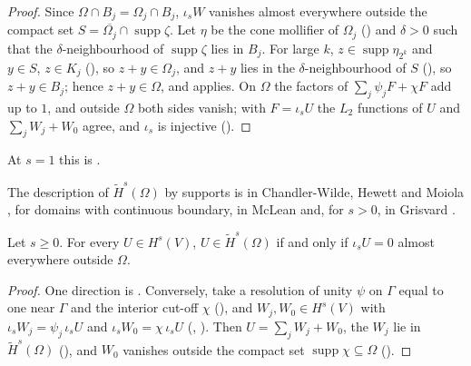 \begin{proof}
\leanok
Since $\Omega \cap B_j = \Omega_j \cap B_j$, $\iota_s W$ vanishes almost everywhere outside the
compact set $S = \overline{\Omega_j} \cap \operatorname{supp} \zeta$. Let $\eta$ be the cone
mollifier of $\Omega_j$ () and $\delta > 0$ such that the
$\delta$-neighbourhood of $\operatorname{supp} \zeta$ lies in $B_j$. For large $k$,
$z \in \operatorname{supp} \eta_{2^k}$ and $y \in S$, $z \in K_j$
(), so $z + y \in \Omega_j$, and $z + y$ lies in the
$\delta$-neighbourhood of $S$ (), so $z + y \in B_j$; hence $z + y \in \Omega$,
and  applies. On $\Omega$ the factors of
$\sum_j \psi_j F + \chi F$ add up to $1$, and outside $\Omega$ both sides vanish; with
$F = \iota_s U$ the $L_2$ functions of $U$ and $\sum_j W_j + W_0$ agree, and $\iota_s$ is
injective ().
\end{proof}

At $s = 1$ this is .

The description of $\tilde H^s(\Omega)$ by supports is in Chandler-Wilde, Hewett and Moiola
\cite[Lemma 3.15]{ChandlerWildeHewettMoiola}, for domains with continuous boundary, in McLean
\cite[Theorem 3.29]{McLean} and, for $s > 0$, in Grisvard \cite[Theorem 1.4.2.2]{Grisvard}.

\begin{theorem}
\label{thm:tilde-space-supports-general}
\leanok
{}
Let $s \geq 0$. For every $U \in H^s(V)$, $U \in \tilde H^s(\Omega)$ if and only if
$\iota_s U = 0$ almost everywhere outside $\Omega$.
\end{theorem}

\begin{proof}
\leanok
One direction is . Conversely, take a resolution
of unity $\psi$ on $\Gamma$ equal to one near $\Gamma$ and the interior cut-off $\chi$
(), and $W_j, W_0 \in H^s(V)$ with
$\iota_s W_j = \psi_j \, \iota_s U$ and $\iota_s W_0 = \chi \, \iota_s U$
(, ). Then $U = \sum_j W_j + W_0$, the
$W_j$ lie in $\tilde H^s(\Omega)$ (), and $W_0$
vanishes outside the compact set $\operatorname{supp} \chi \subseteq \Omega$
().
\end{proof}

